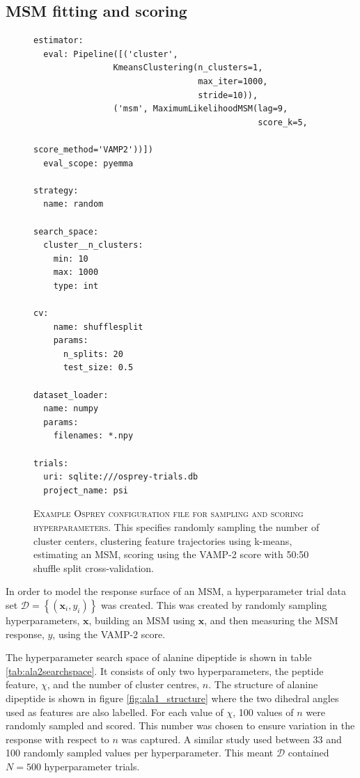 \subsection{MSM fitting and scoring}\label{subsec:msm_fitting}
\begin{figure}
    \centering
    \begin{lstlisting}
estimator:
  eval: Pipeline([('cluster', 
                KmeansClustering(n_clusters=1, 
                                 max_iter=1000, 
                                 stride=10)),
                ('msm', MaximumLikelihoodMSM(lag=9, 
                                             score_k=5, 
                                             score_method='VAMP2'))])
  eval_scope: pyemma

strategy:
  name: random

search_space:
  cluster__n_clusters:
    min: 10
    max: 1000
    type: int

cv:
    name: shufflesplit
    params:
      n_splits: 20
      test_size: 0.5

dataset_loader:
  name: numpy
  params:
    filenames: *.npy

trials:
  uri: sqlite:///osprey-trials.db
  project_name: psi
    \end{lstlisting}
    \caption[Example Osprey configuration file for sampling and scoring hyperparameters]{\textsc{Example Osprey configuration file for sampling and scoring hyperparameters}. This specifies randomly sampling the number of cluster centers, clustering feature trajectories using k-means, estimating an MSM, scoring using the VAMP-2 score with 50:50 shuffle split cross-validation.}\label{fig:osprey_config}
\end{figure}

In order to  model the response surface of an MSM, a hyperparameter trial data set  $\mathcal{D} = \left\{ (\mathbf{x}_{i}, y_{i}) \right\}$ was created. This was created by  randomly sampling hyperparameters, $\mathbf{x}$, building an MSM using $\mathbf{x}$, and then measuring the MSM response, $y$, using the VAMP-2 score. 

The hyperparameter search space of alanine dipeptide is shown in table \ref{tab:ala2searchspace}. It consists of only two hyperparameters, the peptide feature, $\chi$, and the number of cluster centres, $n$.  The structure of alanine dipeptide is shown in figure \ref{fig:ala1_structure} where the two dihedral angles used as features are also labelled.  For each value of $\chi$, \num{100} values of $n$ were randomly sampled and scored. This number was chosen to ensure variation in the response with respect to $n$ was captured. A similar study \cite{husicOptimizedParameterSelection2016} used between \num{33} and \num{100} randomly sampled values per hyperparameter. This meant $\mathcal{D}$ contained $N=500$ hyperparameter trials.  

